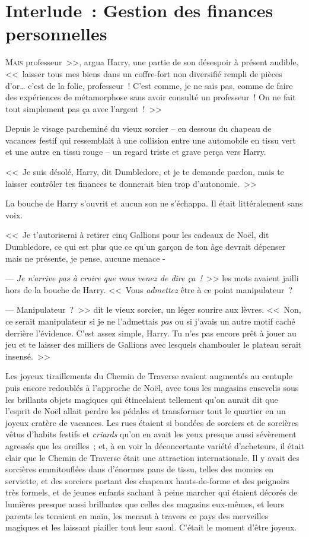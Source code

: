 \chapter{Interlude~: Gestion des finances personnelles}

\lettrine[ante=<<~]{M}{ais} professeur~>>, argua Harry, une partie de son désespoir à présent audible, <<~laisser tous mes biens dans un coffre-fort non diversifié rempli de pièces d'or… c'est de la folie, professeur~! C'est comme, je ne sais pas, comme de faire des expériences de métamorphose sans avoir consulté un professeur~! On ne fait tout simplement pas ça avec l'argent~!~>>

Depuis le visage parcheminé du vieux sorcier -- en dessous du chapeau de vacances festif qui ressemblait à une collision entre une automobile en tissu vert et une autre en tissu rouge -- un regard triste et grave perça vers Harry.

<<~Je suis désolé, Harry, dit Dumbledore, et je te demande pardon, mais te laisser contrôler tes finances te donnerait bien trop d'autonomie.~>>

La bouche de Harry s'ouvrit et aucun son ne s'échappa. Il était littéralement sans voix.

<<~Je t'autoriserai à retirer cinq Gallions pour les cadeaux de Noël, dit Dumbledore, ce qui est plus que ce qu'un garçon de ton âge devrait dépenser mais ne présente, je pense, aucune menace -

--- \emph{Je n'arrive pas à croire que vous venez de dire ça~!}~>> les mots avaient jailli hors de la bouche de Harry. <<~Vous \emph{admettez} être à ce point manipulateur~?

--- Manipulateur~?~>> dit le vieux sorcier, un léger sourire aux lèvres. <<~Non, ce serait manipulateur si je ne l'admettais \emph{pas} ou si j'avais un autre motif caché derrière l'évidence. C'est assez simple, Harry. Tu n'es pas encore prêt à jouer au jeu et te laisser des milliers de Gallions avec lesquels chambouler le plateau serait insensé.~>>

\later

Les joyeux tiraillements du Chemin de Traverse avaient augmentés au centuple puis encore redoublés à l'approche de Noël, avec tous les magasins ensevelis sous les brillants objets magiques qui étincelaient tellement qu'on aurait dit que l'esprit de Noël allait perdre les pédales et transformer tout le quartier en un joyeux cratère de vacances. Les rues étaient si bondées de sorciers et de sorcières vêtus d'habits festifs et \emph{criards} qu'on en avait les yeux presque aussi sévèrement agressés que les oreilles~; et, à en voir la déconcertante variété d'acheteurs, il était clair que le Chemin de Traverse était une attraction internationale. Il y avait des sorcières emmitouflées dans d'énormes pans de tissu, telles des momies en serviette, et des sorciers portant des chapeaux hauts-de-forme et des peignoirs très formels, et de jeunes enfants sachant à peine marcher qui étaient décorés de lumières presque aussi brillantes que celles des magasins eux-mêmes, et leurs parents les tenaient en main, les menant à travers ce pays des merveilles magiques et les laissant piailler tout leur saoul. C'était le moment d'être joyeux.

